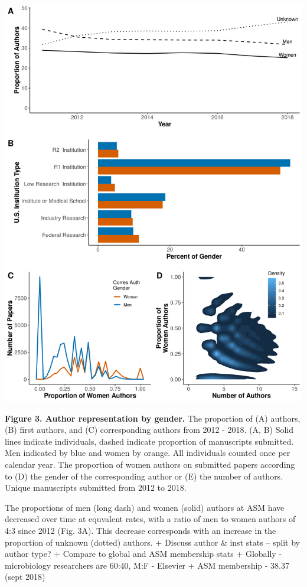 \documentclass[11pt,]{article}
\begin{document}
\includegraphics{Figure_3.png}

\textbf{Figure 3. Author representation by gender.} The proportion of
(A) authors, (B) first authors, and (C) corresponding authors from 2012
- 2018. (A, B) Solid lines indicate individuals, dashed indicate
proportion of manuscripts submitted. Men indicated by blue and women by
orange. All individuals counted once per calendar year. The proportion
of women authors on submitted papers according to (D) the gender of the
corresponding author or (E) the number of authors. Unique manuscripts
submitted from 2012 to 2018.

The proportions of men (long dash) and women (solid) authors at ASM have
decreased over time at equvalent rates, with a ratio of men to women
authors of 4:3 since 2012 (Fig. 3A). This decrease corresponds with an
increase in the proportion of unknown (dotted) authors. + Discuss author
\& inst stats -- split by author type? + Compare to global and ASM
membership stats + Globally - microbiology researchers are 60:40, M:F -
Elsevier + ASM membership - 38.37 (sept 2018)
\end{document}

